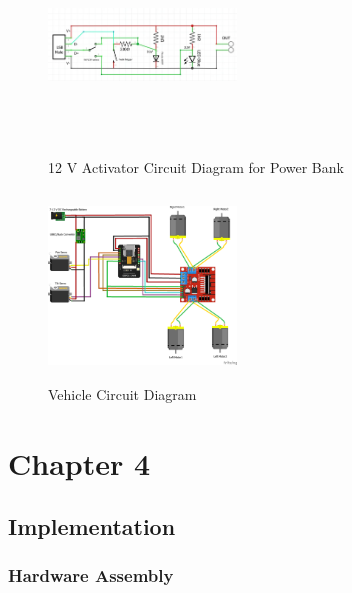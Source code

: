 \documentclass[12pt,a4paper]{report}
\begin{document}
\begin{enumerate}
\begin{figure}[H]
    \centering
    \begin{minipage}{0.45\textwidth}
        \centering
        \includegraphics[width=5cm, height=5cm]{usbPowerbank}  %
        \caption{12 V Activator Circuit Diagram for Power Bank}
        \label{fig:base}
    \end{minipage} \hfill
    \begin{minipage}{0.45\textwidth}
        \centering
        \includegraphics[width=5cm, height=5cm]{circuitDiagram}  %
        \caption{Vehicle Circuit Diagram}
        \label{fig:circuitDiagram}
    \end{minipage}
\end{figure}
  
    
\end{enumerate}





	{\vfill \chapter*{\centering \vfill Chapter 4 \vfill}\vfill}
	\thispagestyle{empty}
	\newpage
	\label{Implementation}
	\section{Implementation}
\label{Hardware Assembly}
\subsection{Hardware Assembly}
\end{document}
